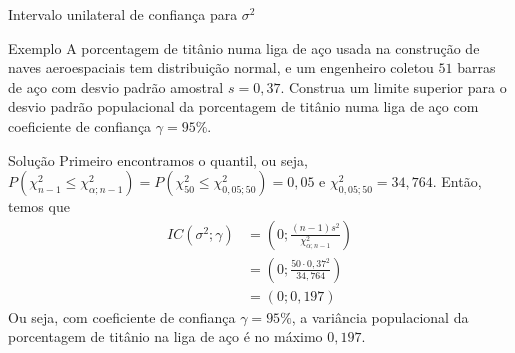 \documentclass[8pt]{beamer}
\begin{document}
\begin{frame}{Intervalo unilateral de confiança para $\sigma^2$}

\normalsize

\begin{block}{Exemplo}
	A porcentagem de titânio numa liga de aço usada na construção de naves aeroespaciais tem distribuição normal, e um engenheiro coletou $51$ barras de aço com desvio padrão amostral $s=0,37$. Construa um limite superior para o desvio padrão populacional da porcentagem de titânio numa liga de aço com coeficiente de confiança $\gamma=95\%$.
\end{block}

\begin{block}{Solução}
	Primeiro encontramos o quantil, ou seja, $P\left( \chi^2_ {n-1} \leq \chi^2_{\alpha; n-1} \right) = P\left( \chi^2_ {50} \leq \chi^2_{0,05; 50} \right) = 0,05$ e $\chi^2_{0,05; 50} = 34,764$. Então, temos que
	\begin{align*}
		IC(\sigma^2; \gamma) &= \left( 0; \frac{(n-1)s^2}{\chi^2_{\alpha; n-1}} \right)\\
		&= \left( 0; \frac{50\cdot 0,37^2}{34,764} \right)\\
		&= \left(0; 0,197\right)
	\end{align*}
	Ou seja, com coeficiente de confiança $\gamma=95\%$, a variância populacional da porcentagem de titânio na liga de aço é no máximo $0,197$.
\end{block}

\normalsize

\end{frame}
\end{document}
